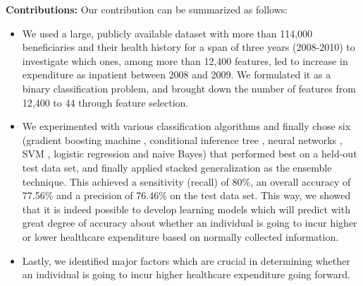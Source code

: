 {\bf Contributions:} Our contribution can be summarized as follows:
\begin{itemize}
\item We used a large, publicly available dataset with more than 114,000 beneficiaries and their health history for a span of three years (2008-2010) to investigate which ones, among more than 12,400 features, led to increase in expenditure as inpatient between 2008 and 2009. We formulated it as a binary classification problem, and brought down the number of features from 12,400 to 44 through feature selection. 
\item We experimented with various classification algorithms and finally chose six (gradient boosting machine \cite{Friedman01}, conditional inference tree \cite{HHZ06}, neural networks \cite{Ripley96}, SVM \cite{CV95}, logistic regression and naive Bayes) that performed best on a held-out test data set, and finally applied stacked generalization \cite{Wolpert92} as the ensemble technique. This achieved a sensitivity (recall) of 80\%, an overall accuracy of 77.56\% and a precision of 76.46\% on the test data set. This way, we showed that it is indeed possible to develop learning models which will predict with great degree of accuracy about whether an individual is going to incur higher or lower healthcare expenditure based on normally collected information.
\item Lastly, we identified major factors which are crucial in determining whether an individual is going to incur higher healthcare expenditure going forward. 
\end{itemize}

 
